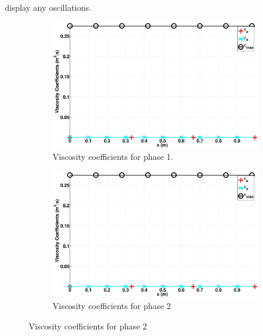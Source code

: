 \documentclass[preprint,10pt]{elsarticle}
\begin{document}
display any oscillations.
%
\begin{figure}[H]
        \centering
        \begin{subfigure}[b]{0.495\textwidth}
                \centering
                \includegraphics[width=\textwidth]{figures/liquid_viscosity.eps}
                \caption{Viscosity coefficients for phase 1.}
                \label{fig:adv-vf-1}
        \end{subfigure}%
        \begin{subfigure}[b]{0.495\textwidth}
                \centering
                \includegraphics[width=\textwidth]{figures/liquid_viscosity.eps}
                \caption{Viscosity coefficients for phase 2}
                \label{fig:adv-vf-2}
        \end{subfigure}
        

\end{figure}
\end{document}

